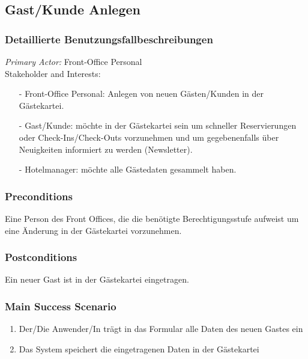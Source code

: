 \documentclass[./detailed_overview_usecases.tex]{subfiles}
\begin{document}
    \subsection{Gast/Kunde Anlegen}
    \subsubsection{Detaillierte Benutzungsfallbeschreibungen}
    \textit{Primary Actor:}
    Front-Office Personal
    \\
    Stakeholder and Interests:
    \begin{itemize}
        \item[-] Front-Office Personal: Anlegen von neuen Gästen/Kunden in der Gästekartei.
        \item[-] Gast/Kunde: möchte in der Gästekartei sein um schneller Reservierungen oder Check-Ins/Check-Outs vorzunehmen
        und um gegebenenfalls über Neuigkeiten informiert zu werden (Newsletter).
        \item[-] Hotelmanager: möchte alle Gästedaten gesammelt haben.
    \end{itemize}

    \subsubsection*{Preconditions}
    Eine Person des Front Offices, die die benötigte Berechtigungsstufe aufweist um eine Änderung in der Gästekartei vorzunehmen.

    \subsubsection*{Postconditions}
    Ein neuer Gast ist in der Gästekartei eingetragen.

    \subsubsection*{Main Success Scenario}
    \begin{enumerate}
        \item Der/Die Anwender/In trägt in das Formular alle Daten des neuen Gastes ein
        \item Das System speichert die eingetragenen Daten in der Gästekartei
    \end{enumerate}
\end{document}
